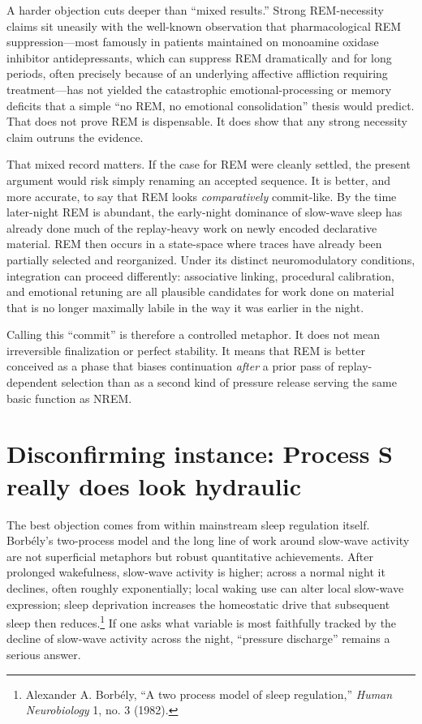 \documentclass[11pt]{article}
\begin{document}
A harder objection cuts deeper than ``mixed results.'' Strong REM-necessity claims sit uneasily with the well-known observation that pharmacological REM suppression---most famously in patients maintained on monoamine oxidase inhibitor antidepressants, which can suppress REM dramatically and for long periods, often precisely because of an underlying affective affliction requiring treatment---has not yielded the catastrophic emotional-processing or memory deficits that a simple ``no REM, no emotional consolidation'' thesis would predict. That does not prove REM is dispensable. It does show that any strong necessity claim outruns the evidence.

That mixed record matters. If the case for REM were cleanly settled, the present argument would risk simply renaming an accepted sequence. It is better, and more accurate, to say that REM looks \emph{comparatively} commit-like. By the time later-night REM is abundant, the early-night dominance of slow-wave sleep has already done much of the replay-heavy work on newly encoded declarative material. REM then occurs in a state-space where traces have already been partially selected and reorganized. Under its distinct neuromodulatory conditions, integration can proceed differently: associative linking, procedural calibration, and emotional retuning are all plausible candidates for work done on material that is no longer maximally labile in the way it was earlier in the night.

Calling this ``commit'' is therefore a controlled metaphor. It does not mean irreversible finalization or perfect stability. It means that REM is better conceived as a phase that biases continuation \emph{after} a prior pass of replay-dependent selection than as a second kind of pressure release serving the same basic function as NREM.

\section{Disconfirming instance: Process S really does look hydraulic}
The best objection comes from within mainstream sleep regulation itself. Borb\'ely's two-process model and the long line of work around slow-wave activity are not superficial metaphors but robust quantitative achievements. After prolonged wakefulness, slow-wave activity is higher; across a normal night it declines, often roughly exponentially; local waking use can alter local slow-wave expression; sleep deprivation increases the homeostatic drive that subsequent sleep then reduces.\footnote{Alexander A. Borb\'ely, ``A two process model of sleep regulation,'' \emph{Human Neurobiology} 1, no. 3 (1982).} If one asks what variable is most faithfully tracked by the decline of slow-wave activity across the night, ``pressure discharge'' remains a serious answer.
\end{document}

